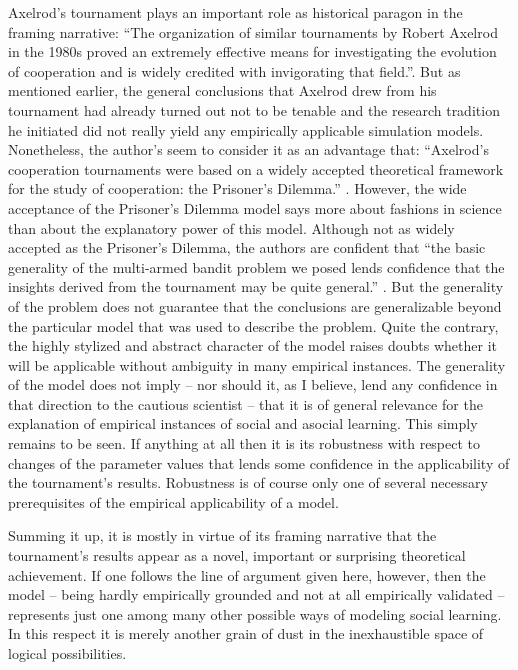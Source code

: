 \documentclass[graybox, English]{svmult}
\begin{document}
Axelrod’s tournament plays an important role as historical paragon in
the framing narrative: “The organization of similar tournaments by
Robert Axelrod in the 1980s proved an extremely effective means for
investigating the evolution of cooperation and is widely credited with
invigorating that field.”\citep[208]{rendell-et-al:2010a}. But as
mentioned earlier, the general conclusions that Axelrod drew from his
tournament had already turned out not to be tenable and the research
tradition he initiated did not really yield any empirically applicable
simulation models. Nonetheless, the author’s seem to consider it as an
advantage that: “Axelrod’s cooperation tournaments were based on a
widely accepted theoretical framework for the study of cooperation:
the Prisoner’s Dilemma.” \citep[209]{rendell-et-al:2010a}. However,
the wide acceptance of the Prisoner’s Dilemma model says more about
fashions in science than about the explanatory power of this
model. Although not as widely accepted as the Prisoner’s Dilemma, the
authors are confident that “the basic generality of the multi-armed
bandit problem we posed lends confidence that the insights derived
from the tournament may be quite general.”
\cite[212]{rendell-et-al:2010a}. But the generality of the problem
does not guarantee that the conclusions are generalizable beyond the
particular model that was used to describe the problem. Quite the
contrary, the highly stylized and abstract character of the model
raises doubts whether it will be applicable without ambiguity in many
empirical instances. The generality of the model does not imply – nor
should it, as I believe, lend any confidence in that direction to the
cautious scientist – that it is of general relevance for the
explanation of empirical instances of social and asocial
learning. This simply remains to be seen. If anything at all then it
is its robustness with respect to changes of the parameter values that
lends some confidence in the applicability of the tournament’s
results. Robustness is of course only one of several necessary
prerequisites of the empirical applicability of a model.

Summing it up, it is mostly in virtue of its framing narrative that
the tournament’s results appear as a novel, important or surprising
theoretical achievement. If one follows the line of argument given
here, however, then the model – being hardly empirically grounded and
not at all empirically validated – represents just one among many
other possible ways of modeling social learning. In this respect it is
merely another grain of dust in the inexhaustible space of logical
possibilities.
\end{document}
